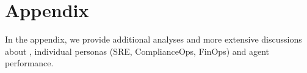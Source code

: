 \doparttoc                 
\faketableofcontents   
\part{Appendix} %
In the appendix, we provide additional analyses and more extensive discussions about \bench, individual personas (SRE, ComplianceOps, FinOps) and agent performance.


\parttoc %
